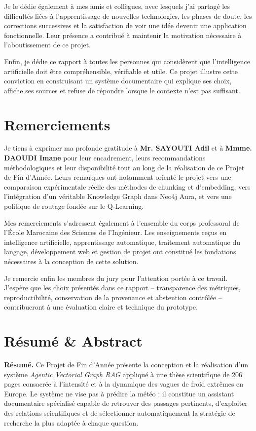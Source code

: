\documentclass[12pt,a4paper,oneside]{report}
\begin{document}
Je le dédie également à mes amis et collègues, avec lesquels j'ai partagé les difficultés liées à l'apprentissage de nouvelles technologies, les phases de doute, les corrections successives et la satisfaction de voir une idée devenir une application fonctionnelle. Leur présence a contribué à maintenir la motivation nécessaire à l'aboutissement de ce projet.

Enfin, je dédie ce rapport à toutes les personnes qui considèrent que l'intelligence artificielle doit être compréhensible, vérifiable et utile. Ce projet illustre cette conviction en construisant un système documentaire qui explique ses choix, affiche ses sources et refuse de répondre lorsque le contexte n'est pas suffisant.

\clearpage
\chapter*{Remerciements}
Je tiens à exprimer ma profonde gratitude à \textbf{Mr. SAYOUTI Adil} et à \textbf{Mmme. DAOUDI Imane} pour leur encadrement, leurs recommandations méthodologiques et leur disponibilité tout au long de la réalisation de ce Projet de Fin d'Année. Leurs remarques ont notamment orienté le projet vers une comparaison expérimentale réelle des méthodes de chunking et d'embedding, vers l'intégration d'un véritable Knowledge Graph dans Neo4j Aura, et vers une politique de routage fondée sur le Q-Learning.

Mes remerciements s'adressent également à l'ensemble du corps professoral de l'École Marocaine des Sciences de l'Ingénieur. Les enseignements reçus en intelligence artificielle, apprentissage automatique, traitement automatique du langage, développement web et gestion de projet ont constitué les fondations nécessaires à la conception de cette solution.

Je remercie enfin les membres du jury pour l'attention portée à ce travail. J'espère que les choix présentés dans ce rapport -- transparence des métriques, reproductibilité, conservation de la provenance et abstention contrôlée -- contribueront à une évaluation claire et technique du prototype.

\clearpage
\chapter*{Résumé \& Abstract}
\textbf{Résumé.} Ce Projet de Fin d'Année présente la conception et la réalisation d'un système \textit{Agentic Vectorial Graph RAG} appliqué à une thèse scientifique de 206 pages consacrée à l'intensité et à la dynamique des vagues de froid extrêmes en Europe. Le système ne vise pas à prédire la météo : il constitue un assistant documentaire spécialisé capable de retrouver des passages pertinents, d'exploiter des relations scientifiques et de sélectionner automatiquement la stratégie de recherche la plus adaptée à chaque question.
\end{document}

